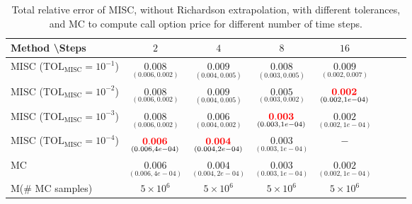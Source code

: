 \begin{table}[h!]
	\centering
	\begin{tabular}{l*{6}{c}r}
		Method \textbackslash  Steps            & $2$ & $4$ & $8$ & $16$  \\
		\hline

		MISC ($\text{TOL}_{\text{MISC}}=10^{-1}$)  &  $\underset{(0.006,0.002)}{\mathbf{0.008}}$ & $\underset{(0.004,0.005)}{\mathbf{0.009}}$& $\underset{(0.003,0.005)}{\mathbf{ 0.008}}$ & $\underset{(0.002,0.007)}{\mathbf{ 0.009}}$   \\

		MISC ($\text{TOL}_{\text{MISC}}=10^{-2}$)  &  $\underset{(0.006,0.002)}{\mathbf{0.008}}$ & $\underset{(0.004,0.005)}{\mathbf{0.009}}$& $\underset{(0.003,0.002)}{\mathbf{ 0.005}}$ & $\underset{(0.002,1e-04)}{\mathbf{ {\color{red}0.002}}}$  \\
		MISC ($\text{TOL}_{\text{MISC}}=10^{-3}$)  &  $\underset{(0.006,0.002)}{\mathbf{0.008}}$& $\underset{(0.004,0.002)}{\mathbf{0.006}}$& $\underset{(0.003,1e-04)}{\mathbf{{\color{red}0.003}}}$  & $\underset{(0.002,1e-04)}{\mathbf{ 0.002}}$  \\
		MISC ($\text{TOL}_{\text{MISC}}=10^{-4}$)  &  $\underset{(0.006,4e-04)}{\mathbf{{\color{red}0.006}}}$ & $\underset{(0.004,2e-04)}{\mathbf{{\color{red}0.004}}}$& $\underset{(0.003,1e-04)}{\mathbf{0.003}}$ & $\mathbf{ -}$ \\

		
		\hline
		MC    & $\underset{(0.006,4e-04)}{\mathbf{0.006}}$  & $\underset{(0.004,2e-04)}{ \mathbf{0.004}}$  & $\underset{(0.003,1e-04)}{\mathbf{0.003}}$ & $\underset{(0.002,1e-04)}{\mathbf{0.002}}$  \\	
		M(\# MC samples) 	& $5 \times 10^6$  & $5 \times 10^6$  & $5 \times 10^6$ & $5 \times 10^6$  \\
		\hline
	\end{tabular}
	\caption{Total relative error of MISC, without Richardson extrapolation, with different tolerances, and MC to compute call option price  for different number of time steps.}
	\label{Total error of MISC and MC to compute Call option price of the different tolerances for different number of time steps. Case set 4, without Richardson extrapolation. The numbers between parentheses are the corresponding absolute errors.}
\end{table}

